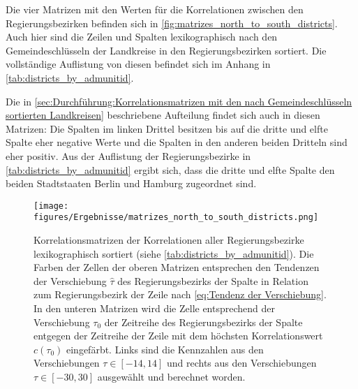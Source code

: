 Die vier Matrizen mit den Werten für die Korrelationen zwischen den Regierungsbezirken befinden sich in \autoref{fig:matrizes_north_to_south_districts}. Auch hier sind die Zeilen und Spalten lexikographisch nach den Gemeindeschlüsseln der Landkreise in den Regierungsbezirken sortiert. Die vollständige Auflistung von diesen befindet sich im Anhang in \autoref{tab:districts_by_admunitid}.

Die in \autoref{sec:Durchführung:Korrelationsmatrizen mit den nach Gemeindeschlüsseln sortierten Landkreisen} beschriebene Aufteilung findet sich auch in diesen Matrizen: Die Spalten im linken Drittel besitzen bis auf die dritte und elfte Spalte eher negative Werte und die Spalten in den anderen beiden Dritteln sind eher positiv. Aus der Auflistung der Regierungsbezirke in \autoref{tab:districts_by_admunitid} ergibt sich, dass die dritte und elfte Spalte den beiden Stadtstaaten Berlin und Hamburg zugeordnet sind.

\begin{figure}[H]
    \centering
    \texttt{[image: figures/Ergebnisse/matrizes\_north\_to\_south\_districts.png]}
    \caption{Korrelationsmatrizen der Korrelationen aller Regierungsbezirke lexikographisch sortiert (siehe \autoref{tab:districts_by_admunitid}). Die Farben der Zellen der oberen Matrizen entsprechen den Tendenzen der Verschiebung $\hat{\tau}$ des Regierungsbezirks der Spalte in Relation zum Regierungsbezirk der Zeile nach \autoref{eq:Tendenz der Verschiebung}. 
    In den unteren Matrizen wird die Zelle entsprechend der Verschiebung $\tau_0$ der Zeitreihe des Regierungsbezirks der Spalte entgegen der Zeitreihe der Zeile mit dem höchsten Korrelationswert $c(\tau_0)$ eingefärbt. Links sind die Kennzahlen aus den Verschiebungen $\tau\in[-14,14]$ und rechts aus den Verschiebungen $\tau\in[-30,30]$ ausgewählt und berechnet worden.
    }
    \label{fig:matrizes_north_to_south_districts}
\end{figure}